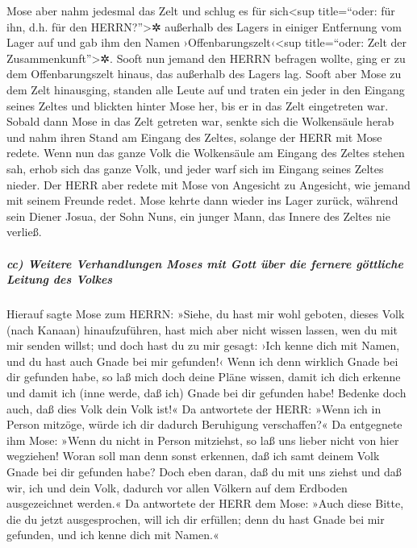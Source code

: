  Mose aber nahm jedesmal das Zelt und schlug es für
sich\textless sup title=``oder: für ihn, d.h. für den
HERRN?''\textgreater✲ außerhalb des Lagers in einiger Entfernung vom
Lager auf und gab ihm den Namen ›Offenbarungszelt‹\textless sup
title=``oder: Zelt der Zusammenkunft''\textgreater✲. Sooft nun jemand
den HERRN befragen wollte, ging er zu dem Offenbarungszelt hinaus, das
außerhalb des Lagers lag.  Sooft aber Mose zu dem Zelt
hinausging, standen alle Leute auf und traten ein jeder in den Eingang
seines Zeltes und blickten hinter Mose her, bis er in das Zelt
eingetreten war.  Sobald dann Mose in das Zelt getreten
war, senkte sich die Wolkensäule herab und nahm ihren Stand am Eingang
des Zeltes, solange der HERR mit Mose redete.  Wenn nun
das ganze Volk die Wolkensäule am Eingang des Zeltes stehen sah, erhob
sich das ganze Volk, und jeder warf sich im Eingang seines Zeltes
nieder.  Der HERR aber redete mit Mose von Angesicht zu
Angesicht, wie jemand mit seinem Freunde redet. Mose kehrte dann wieder
ins Lager zurück, während sein Diener Josua, der Sohn Nuns, ein junger
Mann, das Innere des Zeltes nie verließ.

\hypertarget{cc-weitere-verhandlungen-moses-mit-gott-uxfcber-die-fernere-guxf6ttliche-leitung-des-volkes}{%
\subparagraph{cc) Weitere Verhandlungen Moses mit Gott über die fernere
göttliche Leitung des
Volkes}\label{cc-weitere-verhandlungen-moses-mit-gott-uxfcber-die-fernere-guxf6ttliche-leitung-des-volkes}}

 Hierauf sagte Mose zum HERRN: »Siehe, du hast mir wohl
geboten, dieses Volk (nach Kanaan) hinaufzuführen, hast mich aber nicht
wissen lassen, wen du mit mir senden willst; und doch hast du zu mir
gesagt: ›Ich kenne dich mit Namen, und du hast auch Gnade bei mir
gefunden!‹  Wenn ich denn wirklich Gnade bei dir gefunden
habe, so laß mich doch deine Pläne wissen, damit ich dich erkenne und
damit ich (inne werde, daß ich) Gnade bei dir gefunden habe! Bedenke
doch auch, daß dies Volk dein Volk ist!«  Da antwortete
der HERR: »Wenn ich in Person mitzöge, würde ich dir dadurch Beruhigung
verschaffen?«  Da entgegnete ihm Mose: »Wenn du nicht in
Person mitziehst, so laß uns lieber nicht von hier wegziehen!
 Woran soll man denn sonst erkennen, daß ich samt deinem
Volk Gnade bei dir gefunden habe? Doch eben daran, daß du mit uns ziehst
und daß wir, ich und dein Volk, dadurch vor allen Völkern auf dem
Erdboden ausgezeichnet werden.«  Da antwortete der HERR
dem Mose: »Auch diese Bitte, die du jetzt ausgesprochen, will ich dir
erfüllen; denn du hast Gnade bei mir gefunden, und ich kenne dich mit
Namen.«

